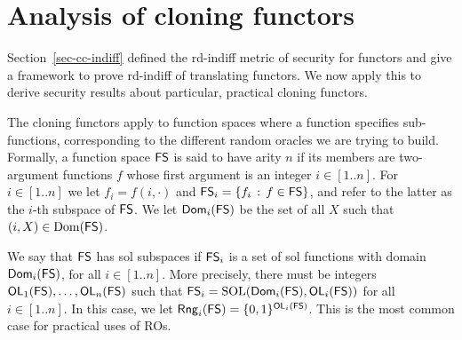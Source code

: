 \section{Analysis of cloning functors}
\label{sec-framework}\label{sec-domain-separation}

Section~\ref{sec-cc-indiff} defined the rd-indiff metric of security for functors and give a framework to prove rd-indiff of translating functors. We now apply this to derive security results about particular, practical cloning functors. 



 The cloning functors apply to function spaces where a function specifies sub-functions, corresponding to the different random oracles we are trying to build. 
%
Formally, a function space $\mathsf{FS}$ is said to have arity $n$ if its members are two-argument functions $f$ whose first argument is an integer $i \in \allowbreak [1..n]$. For $i\in \allowbreak [1..n]$ we let $f_i = f(i,\cdot)$ and $\mathsf{FS}_i \allowbreak = \allowbreak \{f_i \,:\, f\in\mathsf{FS}\}$, and refer to the latter as the $i$-th subspace of $\mathsf{FS}$. We let $\mathsf{Dom}_i(\mathsf{FS})$ be the set of all $X$ such that $(i,X) \allowbreak \in \allowbreak \mathrm{Dom}(\mathsf{\mathsf{FS}})$. 

We say that $\mathsf{FS}$ has sol subspaces if $\mathsf{FS}_i$ is a set of sol functions with domain $\mathsf{Dom}_i(\mathsf{FS})$, for all $i \allowbreak \in \allowbreak [1..n]$. More precisely, there must be integers $\mathsf{OL}_1(\mathsf{FS}), \allowbreak \ldots, \allowbreak \mathsf{OL}_n(\mathsf{FS})$ such that $\mathsf{FS}_i \allowbreak = \allowbreak \mathrm{SOL}(\mathsf{Dom}_i(\mathsf{FS}),\mathsf{OL}_i(\mathsf{FS}))$ for all $i\in [1..n]$. In this case, we let $\mathsf{Rng}_i(\mathsf{FS}) \allowbreak = \allowbreak \{0,1\}^{\mathsf{OL}_i(\mathsf{FS})}$. This is the most common case for practical uses of ROs.


